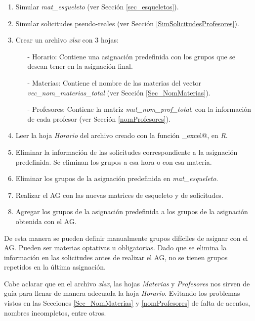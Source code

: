 \begin{enumerate}
\item Simular \textit{mat\_esqueleto} (ver Sección \ref{sec_esqueletos}).

\item Simular solicitudes pseudo-reales (ver Sección \ref{SimSolicitudesProfesores}).

\item Crear un archivo \textit{xlsx} con 3 hojas:

\begin{itemize}
\item[-] Horario: Contiene una asignación predefinida con los grupos que se desean tener en la asignación final.

\item[-] Materias: Contiene el nombre de las materias del vector \textit{vec\_nom\_materias\_total} (ver Sección \ref{Sec_NomMaterias}).

\item[-] Profesores: Contiene la matriz \textit{mat\_nom\_prof\_total}, con la información de cada profesor (ver Sección \ref{nomProfesores}).
\end{itemize}

\item Leer la hoja \textit{Horario} del archivo creado con la función \verb@read_excel@, en \textit{R}.

\item Eliminar la información de las solicitudes correspondiente a la asignación predefinida. Se eliminan los grupos a esa hora o con esa materia.

\item Eliminar los grupos de la asignación predefinida en \textit{mat\_esqueleto}.

\item Realizar el AG con las nuevas matrices de esqueleto y de solicitudes.

\item Agregar los grupos de la asignación predefinida a los grupos de la asignación obtenida con el AG.
\end{enumerate}


De esta manera se pueden definir manualmente grupos difíciles de asignar con el AG. Pueden ser materias optativas u obligatorias. Dado que se elimina la información en las solicitudes antes de realizar el AG, no se tienen grupos repetidos en la última asignación.

Cabe aclarar que en el archivo \textit{xlsx}, las hojas \textit{Materias} y \textit{Profesores} nos sirven de guía para llenar de manera adecuada la hoja \textit{Horario}. Evitando los problemas vistos en las Secciones \ref{Sec_NomMaterias} y \ref{nomProfesores} de falta de acentos, nombres incompletos, entre otros.








